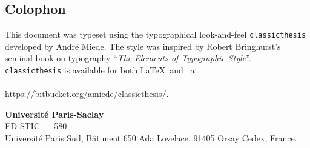 
\pagestyle{empty}


\vspace*{\fill}

\begin{addmargin}[0cm]{0cm}

\section*{Colophon}
\noindent This document was typeset using the typographical look-and-feel
\texttt{cla\-ssic\-the\-sis} developed by Andr\'e Miede. The style was inspired
by Robert Bringhurst's seminal book on typography ``\emph{The Elements of
Typographic Style}''. \texttt{cla\-ssic\-the\-sis} is available for both
\LaTeX~and \mLyX~at \\
\paragraph{}
\url{https://bitbucket.org/amiede/classicthesis/}.

\bigskip
\noindent\textbf{\color{PSaclay}Universit\'e Paris-Saclay} \\
ED STIC --- 580 \\
Universit\'e Paris Sud, B\^atiment 650 Ada Lovelace, 91405 Orsay Cedex, France.

\end{addmargin}

